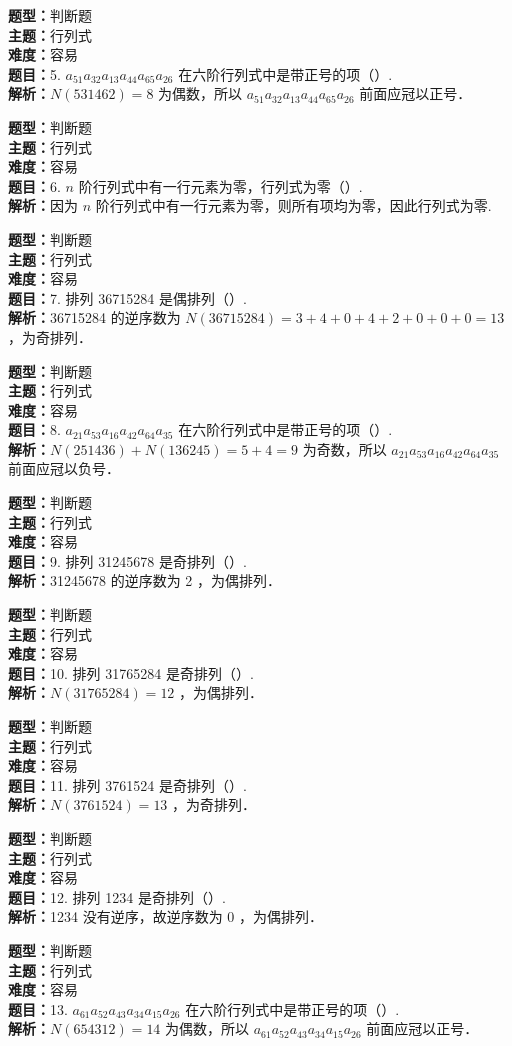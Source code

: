 \documentclass{ctexart}
\newenvironment{question}[5]{%
	\noindent\textbf{题型：}#1\\
	\textbf{主题：}#2\\
	\textbf{难度：}#3\\
	\textbf{题目：}#4\\
	\textbf{解析：}#5\\
	\vspace{1em}
}{}
\begin{document}
	\begin{question}
		{判断题}
		{行列式}
		{容易}
		{5. \(a_{51} a_{32} a_{13} a_{44} a_{65} a_{26}\) 在六阶行列式中是带正号的项（）. }
		{\(N(531462)=8\) 为偶数，所以 \(a_{51} a_{32} a_{13} a_{44} a_{65} a_{26}\) 前面应冠以正号．}
	\end{question}
	
	\begin{question}
		{判断题}
		{行列式}
		{容易}
		{6. \(n\) 阶行列式中有一行元素为零，行列式为零（）. }
		{因为 \(n\) 阶行列式中有一行元素为零，则所有项均为零，因此行列式为零. }
	\end{question}
	
	\begin{question}
		{判断题}
		{行列式}
		{容易}
		{7. 排列 36715284 是偶排列（）. }
		{36715284 的逆序数为 \(N(36715284)=3+4+0+4+2+0+0+0=13\) ，为奇排列．}
	\end{question}
	
	\begin{question}
		{判断题}
		{行列式}
		{容易}
		{8. \(a_{21} a_{53} a_{16} a_{42} a_{64} a_{35}\) 在六阶行列式中是带正号的项（）. }
		{\(N(251436)+N(136245)=5+4=9\) 为奇数，所以 \(a_{21} a_{53} a_{16} a_{42} a_{64} a_{35}\) 前面应冠以负号．}
	\end{question}
	
	\begin{question}
		{判断题}
		{行列式}
		{容易}
		{9. 排列 31245678 是奇排列（）. }
		{31245678 的逆序数为 2 ，为偶排列．}
	\end{question}
	
	\begin{question}
		{判断题}
		{行列式}
		{容易}
		{10. 排列 31765284 是奇排列（）. }
		{\(N(31765284)=12\) ，为偶排列．}
	\end{question}
	
	\begin{question}
		{判断题}
		{行列式}
		{容易}
		{11. 排列 3761524 是奇排列（）. }
		{\(N(3761524)=13\) ，为奇排列．}
	\end{question}
	
	\begin{question}
		{判断题}
		{行列式}
		{容易}
		{12. 排列 1234 是奇排列（）. }
		{1234 没有逆序，故逆序数为 0 ，为偶排列．}
	\end{question}
	
	\begin{question}
		{判断题}
		{行列式}
		{容易}
		{13. \(a_{61} a_{52} a_{43} a_{34} a_{15} a_{26}\) 在六阶行列式中是带正号的项（）. }
		{\(N(654312)=14\) 为偶数，所以 \(a_{61} a_{52} a_{43} a_{34} a_{15} a_{26}\) 前面应冠以正号．}
	\end{question}
	
\end{document}
